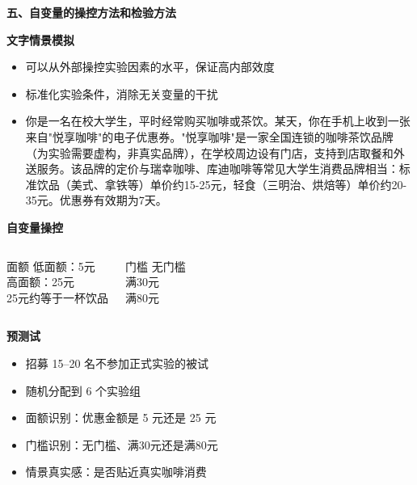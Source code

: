 \documentclass[aspectratio=169,UTF8,zihao=-4]{ctexbeamer}
\newcommand{\bigidea}[1]{
  \begin{center}
    \vspace{0.8em}
    {\LARGE \bfseries #1}
    \vspace{0.6em}
  \end{center}
}
\newcommand{\sectionpageframe}[1]{
  \begin{frame}[plain]
    \begin{center}
      \vfill
      {\Huge \bfseries #1}
      \vfill
    \end{center}
  \end{frame}
}
\begin{document}
\sectionpageframe{五、自变量的操控方法和检验方法}

\begin{frame}
  \bigidea{文字情景模拟}
  \begin{itemize}
    \item \Large 可以从外部操控实验因素的水平，保证高内部效度
    \item \Large 标准化实验条件，消除无关变量的干扰
  \end{itemize}
\end{frame}

\begin{frame}
  \begin{itemize}
    \item \Large 你是一名在校大学生，平时经常购买咖啡或茶饮。某天，你在手机上收到一张来自"悦享咖啡"的电子优惠券。"悦享咖啡"是一家全国连锁的咖啡茶饮品牌（为实验需要虚构，非真实品牌），在学校周边设有门店，支持到店取餐和外送服务。该品牌的定价与瑞幸咖啡、库迪咖啡等常见大学生消费品牌相当：标准饮品（美式、拿铁等）单价约15-25元，轻食（三明治、烘焙等）单价约20-35元。优惠券有效期为7天。
  \end{itemize}
\end{frame}

\begin{frame}
  \bigidea{自变量操控}
  \begin{columns}[T]
    \begin{block}{面额}
      \Large
      低面额：5元\\
      高面额：25元\\
      25元约等于一杯饮品
    \end{block}
    \begin{block}{门槛}
      \Large
      无门槛\\
      满30元\\
      满80元
    \end{block}
  \end{columns}
\end{frame}

\begin{frame}
  \bigidea{预测试}
  \begin{itemize}
    \item \Large 招募 15--20 名不参加正式实验的被试
    \item \Large 随机分配到 6 个实验组
    \item \Large 面额识别：优惠金额是 5 元还是 25 元
    \item \Large 门槛识别：无门槛、满30元还是满80元
    \item \Large 情景真实感：是否贴近真实咖啡消费
  \end{itemize}
\end{frame}
\end{document}
